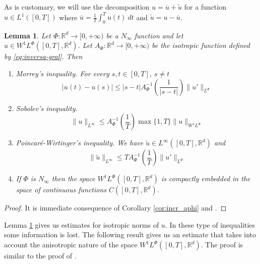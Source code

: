 \documentclass[twoside]{article}
\newtheorem{lem}[thm]{Lemma}
\theoremstyle{remark}
\newcommand{\orlnor}{\|_{L^{\Phi}}}
\newcommand{\linf}{\|_{L^{\infty}}}
\newcommand{\lphi}{L^{\Phi}}
\newcommand{\wphi}{W^{1}\lphi}
\newcommand{\sobnor}{\|_{W^{1}\lphi}}
\newcommand{\rr}{\mathbb{R}}
\renewcommand{\leq}{\leqslant}
\begin{document}
 As is customary, we will use the decomposition $u=\overline{u}+\widetilde{u}$ for a function $u\in L^1([0,T])$  where $\overline{u} =\frac1T\int_0^T u(t)\ dt$ and $\widetilde{u}=u-\overline{u}$.



\begin{lem}\label{lem:inclusion orlicz} Let $\Phi:\rr^d\to [0,+\infty)$ be a $N_{\infty}$
function and let \linebreak[4]$u\in\wphi\left([0,T],\rr^d\right)$. Let 
$A_{\Phi}: \rr^d \to  [0,+\infty)$ be the isotropic function defined by \eqref{eq:inversa-gral}. Then
 
\begin{enumerate}
  \item \emph{Morrey's inequality}.   For every $s,t\in [0,T]$, $s\neq t$
  \begin{equation}
   |u(t)-u(s)| \leq
  |s-t|A_{\Phi}^{-1}\left(\frac{1}{|s-t|}\right)\|u'\orlnor\tag{M.I}\label{in-sob-cont}
  \end{equation}

  \item \emph{Sobolev's inequality}. 
  \begin{equation}
   \|u\linf \leq A_\Phi^{-1}\left(\frac{1}{T}\right)\max\{1,T\}\|u\sobnor\tag{S.I}\label{eq:sobolev}
  \end{equation}

  \item \emph{Poincar\'e-Wirtinger's inequality}. We have $\widetilde{u}\in L^{\infty}\left([0,T],\rr^d\right)$ and 
    \begin{equation}\label{eq:wirtinger-iso}
    \|\widetilde{u}\|_{L^{\infty}} \leq T A_{\Phi}^{-1}\left(\frac{1}{T}\right)\| u'\orlnor\tag{P-W.I}
    \end{equation}
    
    \item\label{it:embeding} If $\Phi$ is $N_{\infty}$ then the space $\wphi\left([0,T],\rr^d\right)$ is compactly embedded in the space of  continuous functions $C([0,T],\rr^d)$.
  \end{enumerate}

\end{lem}

\begin{proof}  It is immediate consequence of Corollary \ref{cor:incr_aphi} and \cite[Lemma 2.1, Corollary 2.2]{ABGMS2015}.
\end{proof}

Lemma \ref{lem:inclusion orlicz} gives us estimates for isotropic norms of $u$. In these type of inequalities some information is lost.  The following result gives us an estimate that takes into account the anisotropic nature of the space $\wphi\left([0,T],\rr^d\right)$. The proof is similar to  the proof of  \cite[Th. 4.5]{chamra2017anisotropic}.
\end{document}
